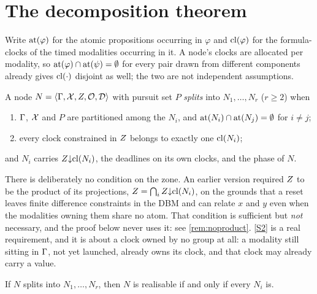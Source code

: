 \section{The decomposition theorem}
\label{sec:theory}

Write $\mathrm{at}(\varphi)$ for the atomic propositions occurring in $\varphi$ and
$\mathrm{cl}(\varphi)$ for the formula-clocks of the timed modalities occurring in
it. A node's clocks are allocated per modality, so
$\mathrm{at}(\varphi)\cap\mathrm{at}(\psi)=\emptyset$ for every pair drawn from different
components already gives $\mathrm{cl}(\cdot)$ disjoint as well; the two are not
independent assumptions.

\begin{definition}[Split]\label{def:split}
A node $N=\langle \Gamma, \mathcal{X}, Z, \mathcal{O}, \mathcal{D}\rangle$ with pursuit set
$P$ \emph{splits} into $N_1,\dots,N_r$ ($r\ge 2$) when
\begin{enumerate}[label=\textup{(S\arabic*)},ref=\textup{(S\arabic*)}]
\item\label{S1} $\Gamma$, $\mathcal{X}$ and $P$ are partitioned among the $N_i$, and
      $\mathrm{at}(N_i)\cap\mathrm{at}(N_j)=\emptyset$ for $i\neq j$;
\item\label{S2} every clock constrained in $Z$ belongs to exactly one
      $\mathrm{cl}(N_i)$;
\end{enumerate}
and $N_i$ carries $Z{\downarrow}\mathrm{cl}(N_i)$, the deadlines on its own clocks,
and the phase of $N$.
\end{definition}

There is deliberately no condition on the zone. An earlier version required
$Z$ to be the product of its projections,
$Z=\bigcap_iZ{\downarrow}\mathrm{cl}(N_i)$, on the grounds that a reset leaves
finite difference constraints in the DBM and can relate $x$ and $y$ even when
the modalities owning them share no atom. That condition is sufficient but
\emph{not} necessary, and the proof below never uses it: see
\cref{rem:noproduct}. \ref{S2} is a real requirement, and it is about a clock
owned by no group at all: a modality still sitting in $\Gamma$, not yet launched, already
owns its clock, and that clock may already carry a value.

\begin{theorem}[Decomposition]\label{thm:decomp}
If $N$ splits into $N_1,\dots,N_r$, then $N$ is realisable if and only if every
$N_i$ is.
\end{theorem}

